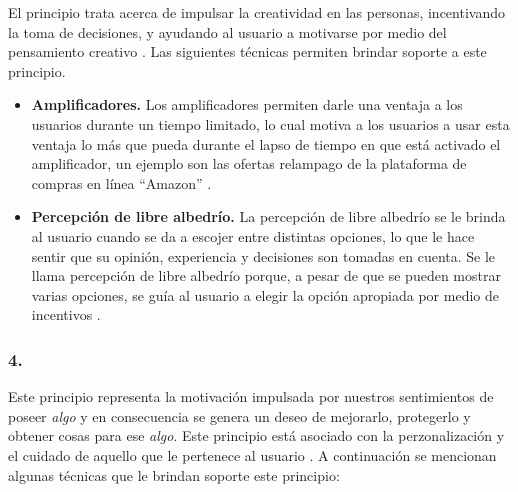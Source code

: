  El principio trata acerca de impulsar la creatividad en las personas, incentivando la toma de
 decisiones, y ayudando al usuario a motivarse por medio del pensamiento creativo \cite[p. 126]{Octalysis}.
 Las siguientes técnicas permiten brindar soporte a este principio.
    
    \begin{itemize}
    \item
    {\bf Amplificadores.}
        Los amplificadores permiten darle una ventaja a los usuarios durante un tiempo limitado,
        lo cual motiva a los usuarios a usar esta ventaja lo más que pueda durante el lapso de tiempo
        en que está activado el amplificador, un ejemplo son las ofertas relampago de la plataforma
        de compras en línea ``Amazon'' \cite[p. 146]{Octalysis}.

        
    \item
    {\bf Percepción de libre albedrío.}
        La percepción de libre albedrío se le brinda al usuario cuando se da a escojer entre distintas
        opciones, lo que le hace sentir que su opinión, experiencia y decisiones son tomadas en cuenta.
        Se le llama percepción de libre albedrío porque, a pesar de que se pueden mostrar varias opciones,
        se guía al usuario a elegir la opción apropiada por medio de incentivos \cite[p. 150]{Octalysis}.
    \end{itemize}
    
\subsubsection{4. \principioIV} \label{subsec:principioIV}
    
 Este principio representa la motivación impulsada por nuestros sentimientos de poseer {\em algo} y en
 consecuencia se genera un deseo de mejorarlo, protegerlo y obtener cosas para ese {\em algo}. %
 Este principio está asociado con la perzonalización y el cuidado de aquello que le pertenece al usuario
 \cite[p. 161]{Octalysis}. A continuación se mencionan algunas técnicas que le brindan soporte este
 principio:
    
